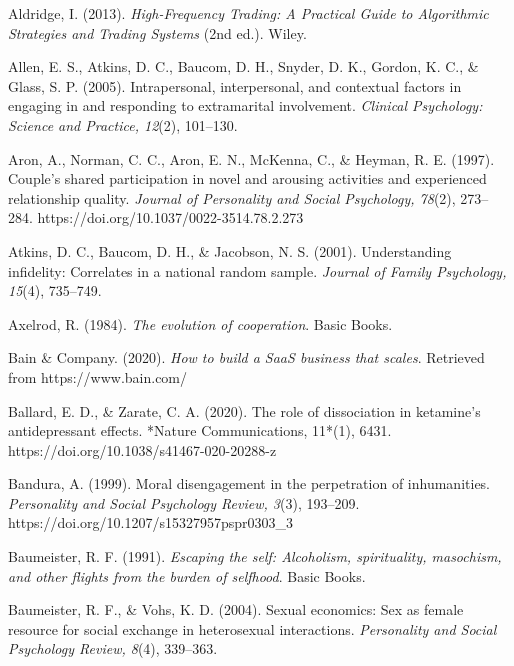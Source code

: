 \begin{thebibliography}{}


    Aldridge, I. (2013). \textit{High-Frequency Trading: A Practical Guide to Algorithmic Strategies and Trading Systems} (2nd ed.). Wiley.

    Allen, E. S., Atkins, D. C., Baucom, D. H., Snyder, D. K., Gordon, K. C., \& Glass, S. P. (2005). Intrapersonal, interpersonal, and contextual factors in engaging in and responding to extramarital involvement. \textit{Clinical Psychology: Science and Practice, 12}(2), 101–130.

    Aron, A., Norman, C. C., Aron, E. N., McKenna, C., \& Heyman, R. E. (1997). Couple's shared participation in novel and arousing activities and experienced relationship quality. \textit{Journal of Personality and Social Psychology, 78}(2), 273--284. https://doi.org/10.1037/0022-3514.78.2.273
    
    Atkins, D. C., Baucom, D. H., \& Jacobson, N. S. (2001). Understanding infidelity: Correlates in a national random sample. \textit{Journal of Family Psychology, 15}(4), 735–749.

    Axelrod, R. (1984). \textit{The evolution of cooperation}. Basic Books.


    Bain \& Company. (2020). \textit{How to build a SaaS business that scales}. Retrieved from https://www.bain.com/

    Ballard, E. D., \& Zarate, C. A. (2020). The role of dissociation in ketamine’s antidepressant effects. *Nature Communications, 11*(1), 6431. https://doi.org/10.1038/s41467-020-20288-z

    Bandura, A. (1999). Moral disengagement in the perpetration of inhumanities. \textit{Personality and Social Psychology Review, 3}(3), 193–209. https://doi.org/10.1207/s15327957pspr0303\_3

    Baumeister, R. F. (1991). \textit{Escaping the self: Alcoholism, spirituality, masochism, and other flights from the burden of selfhood}. Basic Books.
    
    Baumeister, R. F., \& Vohs, K. D. (2004). Sexual economics: Sex as female resource for social exchange in heterosexual interactions. \textit{Personality and Social Psychology Review, 8}(4), 339–363.
    

\end{thebibliography}
